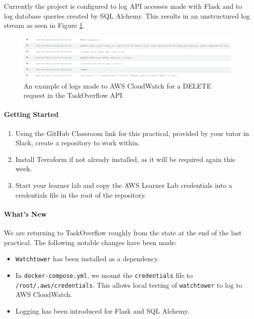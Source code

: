 \documentclass{csse4400}
\begin{document}
Currently the project is configured to log API accesses made with Flask and to log database queries created by SQL Alchemy.
This results in an unstructured log stream as seen in Figure \ref{fig:cloud-logs}.

\begin{figure}[ht]
    \centering
    \begin{adjustwidth}{-7.5mm}{-7.5mm}
        \includegraphics[width=0.95\paperwidth]{images/cloud-watch-log}
    \end{adjustwidth}
    \caption{An example of logs made to AWS CloudWatch for a DELETE request in the TaskOverflow API.}
    \label{fig:cloud-logs}
\end{figure}

\paragraph{Getting Started}
\begin{enumerate}
    \item Using the GitHub Classroom link for this practical, provided by your tutor in Slack, create a repository to work within.
    \item Install Terraform if not already installed, as it will be required again this week.
    \item Start your learner lab and copy the AWS Learner Lab credentials into a credentials file in the root of the repository.
\end{enumerate}

\paragraph{What's New}
We are returning to TaskOverflow roughly from the state at the end of the last practical.
The following notable changes have been made:
\begin{itemize}
    \item \texttt{Watchtower} has been installed as a dependency.
    \item In \texttt{docker-compose.yml}, we mount the \texttt{credentials} file to \texttt{/root/.aws/credentials}.
        This allows local testing of \texttt{watchtower} to log to AWS CloudWatch.
    \item Logging has been introduced for Flask and SQL Alchemy.
\end{itemize}
\end{document}
